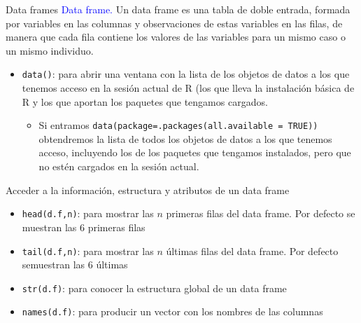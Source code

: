 \documentclass[
  ignorenonframetext,
  aspectratio=169]{beamer}
\providecommand{\tightlist}{%
  \setlength{\itemsep}{0pt}\setlength{\parskip}{0pt}}
\newcommand\blue[1]{\textcolor{blue}{#1}}
\begin{document}
\begin{frame}[fragile]{Data frames}
\protect\hypertarget{data-frames}{}
\blue{Data frame.} Un data frame es una tabla de doble entrada, formada
por variables en las columnas y observaciones de estas variables en las
filas, de manera que cada fila contiene los valores de las variables
para un mismo caso o un mismo individuo.

\begin{itemize}
\item
  \texttt{data()}: para abrir una ventana con la lista de los objetos de
  datos a los que tenemos acceso en la sesión actual de R (los que lleva
  la instalación básica de R y los que aportan los paquetes que tengamos
  cargados.

  \begin{itemize}
  \tightlist
  \item
    Si entramos \texttt{data(package=.packages(all.available\ =\ TRUE))}
    obtendremos la lista de todos los objetos de datos a los que tenemos
    acceso, incluyendo los de los paquetes que tengamos instalados, pero
    que no estén cargados en la sesión actual.
  \end{itemize}
\end{itemize}
\end{frame}

\begin{frame}[fragile]{Acceder a la información, estructura y atributos
de un data frame}
\protect\hypertarget{acceder-a-la-informaciuxf3n-estructura-y-atributos-de-un-data-frame}{}
\begin{itemize}
\tightlist
\item
  \texttt{head(d.f,n)}: para mostrar las \(n\) primeras filas del data
  frame. Por defecto se muestran las 6 primeras filas
\item
  \texttt{tail(d.f,n)}: para mostrar las \(n\) últimas filas del data
  frame. Por defecto semuestran las 6 últimas
\item
  \texttt{str(d.f)}: para conocer la estructura global de un data frame
\item
  \texttt{names(d.f)}: para producir un vector con los nombres de las
  columnas
\end{itemize}
\end{frame}
\end{document}
